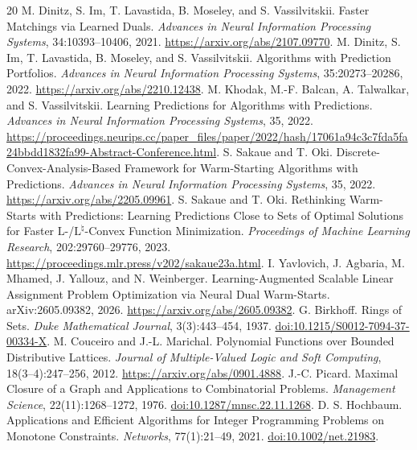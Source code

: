\documentclass[10pt,letterpaper]{article}
\begin{document}
\begin{thebibliography}{20}\small
\setlength{\itemsep}{3pt}
 M. Dinitz, S. Im, T. Lavastida, B. Moseley, and S. Vassilvitskii. Faster Matchings via Learned Duals. \emph{Advances in Neural Information Processing Systems}, 34:10393--10406, 2021. \url{https://arxiv.org/abs/2107.09770}.
 M. Dinitz, S. Im, T. Lavastida, B. Moseley, and S. Vassilvitskii. Algorithms with Prediction Portfolios. \emph{Advances in Neural Information Processing Systems}, 35:20273--20286, 2022. \url{https://arxiv.org/abs/2210.12438}.
 M. Khodak, M.-F. Balcan, A. Talwalkar, and S. Vassilvitskii. Learning Predictions for Algorithms with Predictions. \emph{Advances in Neural Information Processing Systems}, 35, 2022. \url{https://proceedings.neurips.cc/paper_files/paper/2022/hash/17061a94c3c7fda5fa24bbdd1832fa99-Abstract-Conference.html}.
 S. Sakaue and T. Oki. Discrete-Convex-Analysis-Based Framework for Warm-Starting Algorithms with Predictions. \emph{Advances in Neural Information Processing Systems}, 35, 2022. \url{https://arxiv.org/abs/2205.09961}.
 S. Sakaue and T. Oki. Rethinking Warm-Starts with Predictions: Learning Predictions Close to Sets of Optimal Solutions for Faster $\mathrm{L}$-/$\mathrm{L}^{\natural}$-Convex Function Minimization. \emph{Proceedings of Machine Learning Research}, 202:29760--29776, 2023. \url{https://proceedings.mlr.press/v202/sakaue23a.html}.
 I. Yavlovich, J. Agbaria, M. Mhamed, J. Yallouz, and N. Weinberger. Learning-Augmented Scalable Linear Assignment Problem Optimization via Neural Dual Warm-Starts. arXiv:2605.09382, 2026. \url{https://arxiv.org/abs/2605.09382}.
 G. Birkhoff. Rings of Sets. \emph{Duke Mathematical Journal}, 3(3):443--454, 1937. \href{https://doi.org/10.1215/S0012-7094-37-00334-X}{doi:10.1215/S0012-7094-37-00334-X}.
 M. Couceiro and J.-L. Marichal. Polynomial Functions over Bounded Distributive Lattices. \emph{Journal of Multiple-Valued Logic and Soft Computing}, 18(3--4):247--256, 2012. \url{https://arxiv.org/abs/0901.4888}.
 J.-C. Picard. Maximal Closure of a Graph and Applications to Combinatorial Problems. \emph{Management Science}, 22(11):1268--1272, 1976. \href{https://doi.org/10.1287/mnsc.22.11.1268}{doi:10.1287/mnsc.22.11.1268}.
 D. S. Hochbaum. Applications and Efficient Algorithms for Integer Programming Problems on Monotone Constraints. \emph{Networks}, 77(1):21--49, 2021. \href{https://doi.org/10.1002/net.21983}{doi:10.1002/net.21983}.

\end{thebibliography}
\end{document}
